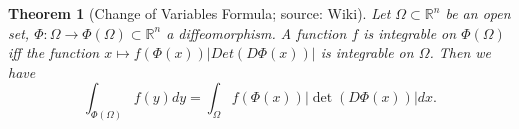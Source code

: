 \documentclass[12pt,a4paper]{article}
\newtheorem{thm}[definition]{Theorem}
\newcommand{\Rn}{\mathbb{R}^n}
\begin{document}
\begin{thm}[Change of Variables Formula; source: Wiki]
Let $\Omega \subset \Rn$ be an open set, $\Phi: \Omega \rightarrow \Phi(\Omega)\subset\Rn$ a diffeomorphism. A function $f$ is integrable on $\Phi(\Omega)$ iff the function $x \mapsto f(\Phi(x))\lvert Det(D\Phi(x)) \rvert$ is integrable on $\Omega$. Then we have
\begin{equation}
\int_{\Phi(\Omega)} f(y) dy = \int_{\Omega} f(\Phi(x))\lvert \det(D\Phi(x)) \rvert dx.
\end{equation}
\end{thm}
\end{document}
